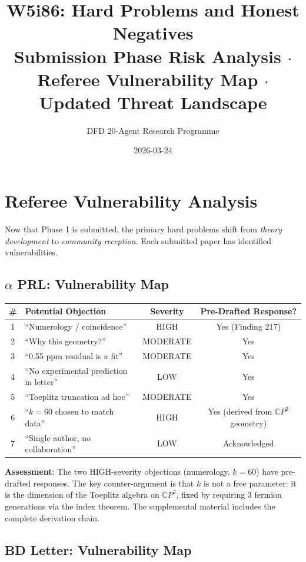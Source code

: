 \documentclass[11pt,a4paper]{article}
\title{W5i86: Hard Problems and Honest Negatives\\[6pt]
\large Submission Phase Risk Analysis $\cdot$ Referee Vulnerability Map $\cdot$ Updated Threat Landscape}
\author{DFD 20-Agent Research Programme}
\date{2026-03-24}
\begin{document}
\maketitle

\section{Referee Vulnerability Analysis}

Now that Phase 1 is submitted, the primary hard problems shift from \emph{theory development} to \emph{community reception}. Each submitted paper has identified vulnerabilities.

\subsection{$\alpha$ PRL: Vulnerability Map}

\begin{center}
\begin{tabular}{clcc}
\toprule
\textbf{\#} & \textbf{Potential Objection} & \textbf{Severity} & \textbf{Pre-Drafted Response?} \\
\midrule
1 & ``Numerology / coincidence'' & HIGH & Yes (Finding 217) \\
2 & ``Why this geometry?'' & MODERATE & Yes \\
3 & ``0.55 ppm residual is a fit'' & MODERATE & Yes \\
4 & ``No experimental prediction in letter'' & LOW & Yes \\
5 & ``Toeplitz truncation ad hoc'' & MODERATE & Yes \\
6 & ``$k=60$ chosen to match data'' & HIGH & Yes (derived from $\mathbb{C}P^2$ geometry) \\
7 & ``Single author, no collaboration'' & LOW & Acknowledged \\
\bottomrule
\end{tabular}
\end{center}

\textbf{Assessment}: The two HIGH-severity objections (numerology, $k=60$) have pre-drafted responses. The key counter-argument is that $k$ is not a free parameter: it is the dimension of the Toeplitz algebra on $\mathbb{C}P^2$, fixed by requiring 3 fermion generations via the index theorem. The supplemental material includes the complete derivation chain.

\subsection{BD Letter: Vulnerability Map}
\end{document}
